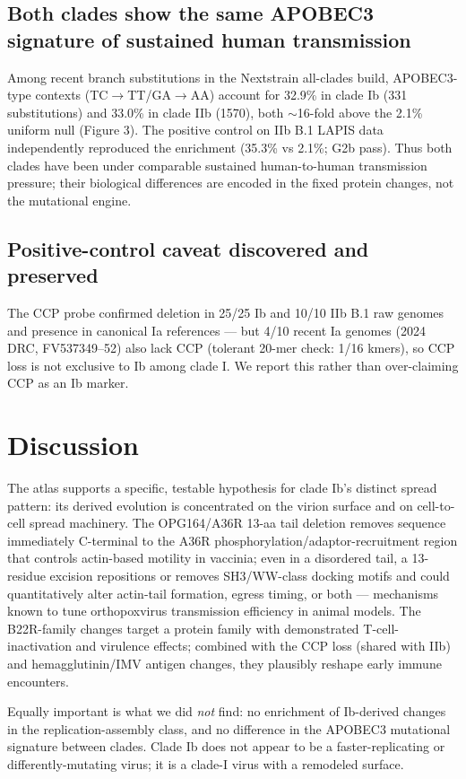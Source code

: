 \documentclass[11pt]{article}
\begin{document}
\subsection{Both clades show the same APOBEC3 signature of sustained human transmission}
Among recent branch substitutions in the Nextstrain all-clades build, APOBEC3-type contexts
(TC$\rightarrow$TT/GA$\rightarrow$AA) account for 32.9\% in clade Ib (331 substitutions) and 33.0\%
in clade IIb (1570), both $\sim$16-fold above the 2.1\% uniform null (Figure 3). The positive
control on IIb B.1 LAPIS data independently reproduced the enrichment (35.3\% vs 2.1\%; G2b pass).
Thus both clades have been under comparable sustained human-to-human transmission pressure; their
biological differences are encoded in the fixed protein changes, not the mutational engine.

\subsection{Positive-control caveat discovered and preserved}
The CCP probe confirmed deletion in 25/25 Ib and 10/10 IIb B.1 raw genomes and presence in canonical
Ia references --- but 4/10 recent Ia genomes (2024 DRC, FV537349--52) also lack CCP (tolerant 20-mer
check: 1/16 kmers), so CCP loss is not exclusive to Ib among clade I. We report this rather than
over-claiming CCP as an Ib marker.

\section{Discussion}
The atlas supports a specific, testable hypothesis for clade Ib's distinct spread pattern: its
derived evolution is concentrated on the virion surface and on cell-to-cell spread machinery. The
OPG164/A36R 13-aa tail deletion removes sequence immediately C-terminal to the A36R
phosphorylation/adaptor-recruitment region that controls actin-based motility in vaccinia; even in a
disordered tail, a 13-residue excision repositions or removes SH3/WW-class docking motifs and could
quantitatively alter actin-tail formation, egress timing, or both --- mechanisms known to tune
orthopoxvirus transmission efficiency in animal models. The B22R-family changes target a protein
family with demonstrated T-cell-inactivation and virulence effects; combined with the CCP loss
(shared with IIb) and hemagglutinin/IMV antigen changes, they plausibly reshape early immune
encounters.

Equally important is what we did \emph{not} find: no enrichment of Ib-derived changes in the
replication-assembly class, and no difference in the APOBEC3 mutational signature between clades.
Clade Ib does not appear to be a faster-replicating or differently-mutating virus; it is a clade-I
virus with a remodeled surface.
\end{document}
